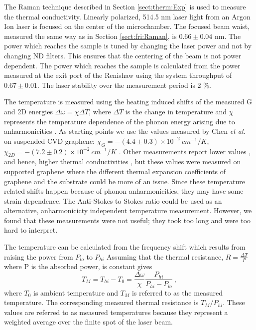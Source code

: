 The Raman technique described in Section \ref{sect:therm:Exp} is used to measure the thermal conductivity.
Linearly polarized, 514.5 nm laser light from an Argon Ion laser is focused on the center of the microchamber.
The focused beam waist, measured the same way as in Section \ref{sect:fri:Raman}, is $0.66 \pm 0.04$ nm.
The power which reaches the sample is tuned by changing the laser power and not by changing ND filters.
This ensures that the centering of the beam is not power dependent.
The power which reaches the sample is calculated from the power measured at the exit port of the Renishaw using the system throughput of $0.67 \pm 0.01$.
The laser stability over the measurement period is 2 \%.

The temperature is measured using the heating induced shifts of the measured G and 2D energies $\Delta \omega=\chi \Delta T$, where $\Delta T$ is the change in temperature and $\chi$ represents the temperature dependence of the phonon energy arising due to anharmonicities \cite{Bonini2007}.
As starting points we use the values measured by Chen \textit{et al.} on suspended CVD graphene: $\chi_G=-(4.4 \pm 0.3) \times 10^{-2} \ cm^{-1}/K$, $\chi_{2D}=-(7.2 \pm 0.2) \times 10^{-2} \ cm^{-1}/K$ \cite{Chen2011a}.
Other measurements report lower values \cite{Calizo2007}, and hence, higher thermal conductivities \cite{Balandin2008}, but these values were measured on supported graphene where the different thermal expansion coefficients of graphene and the substrate could be more of an issue.
Since these temperature related shifts happen because of phonon anharmonicities, they may have some strain dependence.
The Anti-Stokes to Stokes ratio could be used as an alternative, anharmonicicty independent temperature measurement.
However, we found that these measurements were not useful; they took too long and were too hard to interpret.

The temperature can be calculated from the frequency shift which results from raising the power from $P_{lo}$ to $P_{hi}$ 
Assuming that the thermal resistance, $R=\frac{\Delta T}{P}$ where P is the absorbed power, is constant gives
\begin{equation*}
	T_M=T_{hi}-T_0=\frac{\Delta \omega}{\chi} \frac{P_{hi}}{P_{hi}-P_{lo}} \ ,
\end{equation*}
where $T_0$ is ambient temperature and $T_M$ is referred to as the measured temperature.
The corresponding measured thermal resistance is $T_M/P_{hi}$.
These values are referred to as measured temperatures because they represent a weighted average over the finite spot of the laser beam.

